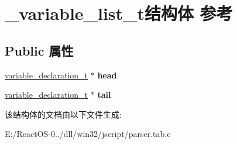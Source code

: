 \hypertarget{struct__variable__list__t}{}\section{\+\_\+variable\+\_\+list\+\_\+t结构体 参考}
\label{struct__variable__list__t}
\subsection*{Public 属性}
\begin{DoxyCompactItemize}
\item 
\mbox{\label{struct__variable__list__t_a8d27dae12a72bbb382a4cd7638d50716}} 
\hyperlink{struct__variable__declaration__t}{variable\+\_\+declaration\+\_\+t} $\ast$ {\bfseries head}
\item 
\mbox{\label{struct__variable__list__t_af66b9f8d0d783ede342b0654753c4060}} 
\hyperlink{struct__variable__declaration__t}{variable\+\_\+declaration\+\_\+t} $\ast$ {\bfseries tail}
\end{DoxyCompactItemize}


该结构体的文档由以下文件生成\+:\begin{DoxyCompactItemize}
\item 
E\+:/\+React\+O\+S-\/0../dll/win32/jscript/parser.\+tab.\+c\end{DoxyCompactItemize}

